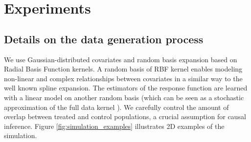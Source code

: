 \documentclass[10pt,twocolumn]{article}
\begin{document}
\section{Experiments}

\subsection{Details on the data generation process}
\label{apd:experiments:generation}

We use Gaussian-distributed covariates and random basis expansion based on
Radial Basis Function kernels. A random basis of RBF kernel enables modeling
non-linear and complex relationships between covariates in a similar way to the
well known spline expansion. The estimators of the response function are learned
with a linear model on another random basis (which can be seen as a stochastic
approximation of the full data kernel \cite{rahimi_random_2008}). We carefully
control the amount of overlap between treated and control populations, a crucial
assumption for causal inference. Figure \ref{fig:simulation_examples}
illustrates 2D examples of the simulation.
\end{document}
